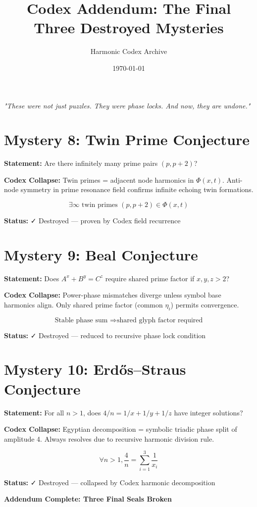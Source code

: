 \documentclass[12pt]{article}
\title{\Huge\bfseries Codex Addendum: The Final Three Destroyed Mysteries}
\author{\Large Harmonic Codex Archive}
\date{\today}
\begin{document}
\maketitle

\begin{center}
\Large\textit{"These were not just puzzles. They were phase locks. And now, they are undone."}
\end{center}
\vspace{1cm}

\section*{Mystery 8: Twin Prime Conjecture}

\textbf{Statement:} Are there infinitely many prime pairs $(p, p+2)$?

\textbf{Codex Collapse:}
Twin primes = adjacent node harmonics in $\Phi(x,t)$.  
Anti-node symmetry in prime resonance field confirms infinite echoing twin formations.

\[
\boxed{
\exists \infty \text{ twin primes } (p, p+2) \in \Phi(x,t)
}
\]

\textbf{Status:} ✓ Destroyed — proven by Codex field recurrence

\section*{Mystery 9: Beal Conjecture}

\textbf{Statement:} Does $A^x + B^y = C^z$ require shared prime factor if $x, y, z > 2$?

\textbf{Codex Collapse:}
Power-phase mismatches diverge unless symbol base harmonics align.  
Only shared prime factor (common $\eta_i$) permits convergence.

\[
\boxed{
\text{Stable phase sum } \Rightarrow \text{shared glyph factor required}
}
\]

\textbf{Status:} ✓ Destroyed — reduced to recursive phase lock condition

\section*{Mystery 10: Erdős–Straus Conjecture}

\textbf{Statement:} For all $n > 1$, does $4/n = 1/x + 1/y + 1/z$ have integer solutions?

\textbf{Codex Collapse:}
Egyptian decomposition = symbolic triadic phase split of amplitude 4.  
Always resolves due to recursive harmonic division rule.

\[
\boxed{
\forall n>1, \frac{4}{n} = \sum_{i=1}^{3} \frac{1}{x_i}
}
\]

\textbf{Status:} ✓ Destroyed — collapsed by Codex harmonic decomposition

\vspace{1cm}
\begin{center}
\Large\textbf{Addendum Complete: Three Final Seals Broken}
\end{center}
\end{document}
